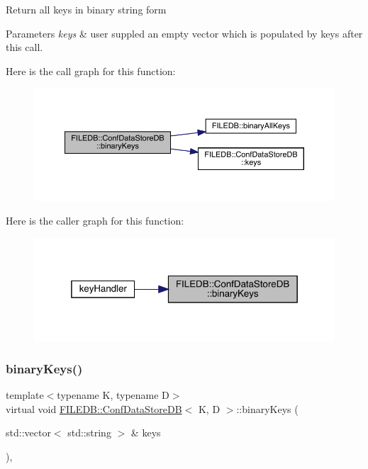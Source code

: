 Return all keys in binary string form 
\begin{DoxyParams}{Parameters}
{\em keys} & user suppled an empty vector which is populated by keys after this call. \\
\hline
\end{DoxyParams}
Here is the call graph for this function\+:
\nopagebreak
\begin{figure}[H]
\begin{center}
\leavevmode
\includegraphics[width=350pt]{d8/d19/classFILEDB_1_1ConfDataStoreDB_a1d0e8e27cd8fc6b24ece52259d1ab2b0_cgraph}
\end{center}
\end{figure}
Here is the caller graph for this function\+:\nopagebreak
\begin{figure}[H]
\begin{center}
\leavevmode
\includegraphics[width=319pt]{d8/d19/classFILEDB_1_1ConfDataStoreDB_a1d0e8e27cd8fc6b24ece52259d1ab2b0_icgraph}
\end{center}
\end{figure}
\mbox{\label{classFILEDB_1_1ConfDataStoreDB_a1d0e8e27cd8fc6b24ece52259d1ab2b0}} 
\subsubsection{\texorpdfstring{binaryKeys()}{binaryKeys()}\hspace{0.1cm}{\footnotesize\ttfamily [2/2]}}
{\footnotesize\ttfamily template$<$typename K, typename D$>$ \\
virtual void \mbox{\hyperlink{classFILEDB_1_1ConfDataStoreDB}{F\+I\+L\+E\+D\+B\+::\+Conf\+Data\+Store\+DB}}$<$ K, D $>$\+::binary\+Keys (\begin{DoxyParamCaption}\item[{std\+::vector$<$ std\+::string $>$ \&}]{keys }\end{DoxyParamCaption})\hspace{0.3cm}{\ttfamily [inline]}, {\ttfamily [virtual]}}

